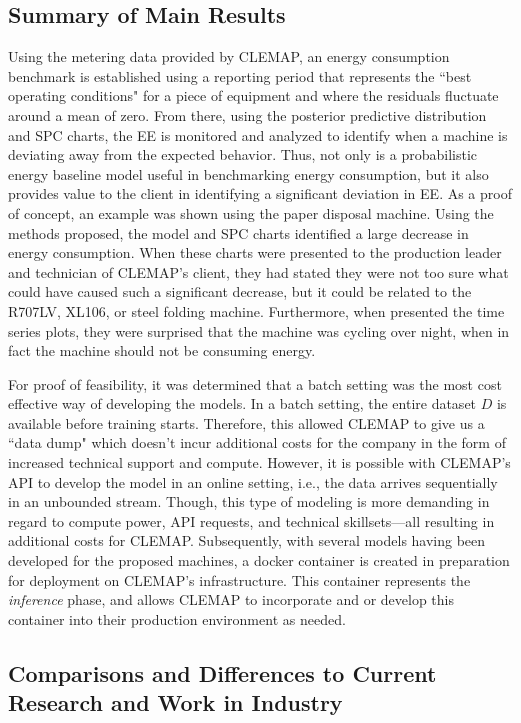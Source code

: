 \subsection{Summary of Main Results}

Using the metering data provided by CLEMAP, an energy consumption benchmark is established using a reporting period that represents the ``best operating conditions" for a piece of equipment and where the residuals fluctuate around a mean of zero. From there, using the posterior predictive distribution and SPC charts, the EE is monitored and analyzed to identify when a machine is deviating away from the expected behavior. Thus, not only is a probabilistic energy baseline model useful in benchmarking energy consumption, but it also provides value to the client in identifying a significant deviation in EE. As a proof of concept, an example was shown using the paper disposal machine. Using the methods proposed, the model and SPC charts identified a large decrease in energy consumption. When these charts were presented to the production leader and technician of CLEMAP's client, they had stated they were not too sure what could have caused such a significant decrease, but it could be related to the R707LV, XL106, or steel folding machine. Furthermore, when presented the time series plots, they were surprised that the machine was cycling over night, when in fact the machine should not be consuming energy.

For proof of feasibility, it was determined that a batch setting was the most cost effective way of developing the models. In a batch setting, the entire dataset $D$ is available before training starts. Therefore, this allowed CLEMAP to give us a ``data dump" which doesn't incur additional costs for the company in the form of increased technical support and compute. However, it is possible with CLEMAP's \ac{API} to develop the model in an online setting, i.e., the data arrives sequentially in an unbounded stream. Though, this type of modeling is more demanding in regard to compute power, API requests, and technical skillsets—all resulting in additional costs for CLEMAP. Subsequently, with several models having been developed for the proposed machines, a docker container is created in preparation for deployment on CLEMAP's infrastructure. This container represents the \textit{inference} phase, and allows CLEMAP to incorporate and or develop this container into their production environment as needed. 

\subsection{Comparisons and Differences to Current Research and Work in Industry}

